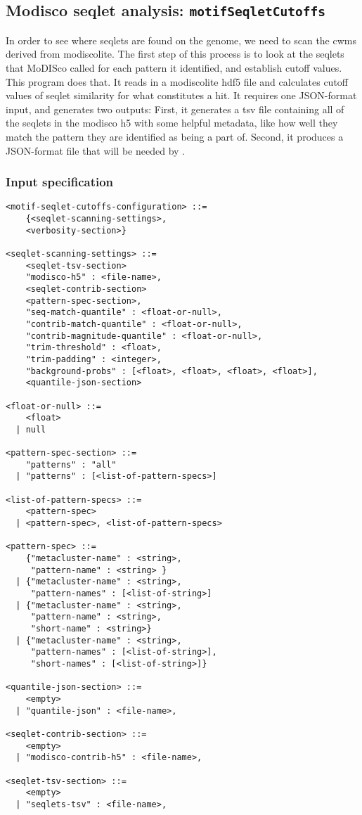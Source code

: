 \documentclass{article}
\begin{document}
\newpage

\subsection{Modisco seqlet analysis: \texttt{motifSeqletCutoffs}}\label{prog:motifSeqletCutoffs}
In order to see where seqlets are found on the genome, we need to scan the cwms derived from
modiscolite.
The first step of this process is to look at the seqlets that MoDISco called for each pattern it
identified, and establish cutoff values.
This program does that.
It reads in a modiscolite hdf5 file and calculates cutoff values of seqlet similarity for what
constitutes a hit.
It requires one JSON-format input, and generates two outputs: First, it generates a tsv file
containing all of the seqlets in the modisco h5 with some helpful metadata, like how well they
match the pattern they are identified as being a part of.
Second, it produces a JSON-format file that will be needed by .

\subsubsection{Input specification}
\begin{lstlisting}
<motif-seqlet-cutoffs-configuration> ::=
    {<seqlet-scanning-settings>,
    <verbosity-section>}

<seqlet-scanning-settings> ::=
    <seqlet-tsv-section>
    "modisco-h5" : <file-name>,
    <seqlet-contrib-section>
    <pattern-spec-section>,
    "seq-match-quantile" : <float-or-null>,
    "contrib-match-quantile" : <float-or-null>,
    "contrib-magnitude-quantile" : <float-or-null>,
    "trim-threshold" : <float>,
    "trim-padding" : <integer>,
    "background-probs" : [<float>, <float>, <float>, <float>],
    <quantile-json-section>

<float-or-null> ::=
    <float>
  | null

<pattern-spec-section> ::=
    "patterns" : "all"
  | "patterns" : [<list-of-pattern-specs>]

<list-of-pattern-specs> ::=
    <pattern-spec>
  | <pattern-spec>, <list-of-pattern-specs>

<pattern-spec> ::=
    {"metacluster-name" : <string>,
     "pattern-name" : <string> }
  | {"metacluster-name" : <string>,
     "pattern-names" : [<list-of-string>]
  | {"metacluster-name" : <string>,
     "pattern-name" : <string>,
     "short-name" : <string>}
  | {"metacluster-name" : <string>,
     "pattern-names" : [<list-of-string>],
     "short-names" : [<list-of-string>]}

<quantile-json-section> ::=
    <empty>
  | "quantile-json" : <file-name>,

<seqlet-contrib-section> ::=
    <empty>
  | "modisco-contrib-h5" : <file-name>,

<seqlet-tsv-section> ::=
    <empty>
  | "seqlets-tsv" : <file-name>,
\end{lstlisting}
\end{document}
